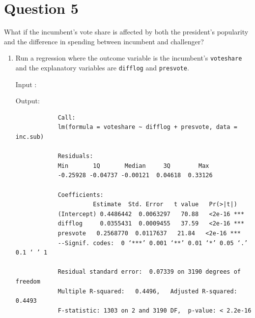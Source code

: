 \documentclass[12pt,letterpaper]{article}
\begin{document}
\section*{Question 5}
\noindent What if the incumbent's vote share is affected by both the president's popularity and the difference in spending between incumbent and challenger? 
	\begin{enumerate}
		\item Run a regression where the outcome variable is the incumbent's \texttt{voteshare} and the explanatory variables are \texttt{difflog} and \texttt{presvote}.	
		
		\noindent Input :
		  
		
		
		Output:
		\begin{verbatim}
			Call:
			lm(formula = voteshare ~ difflog + presvote, data = inc.sub)
			
			Residuals:    
			Min       1Q       Median     3Q        Max 
			-0.25928 -0.04737 -0.00121  0.04618  0.33126 
			
			Coefficients:            
			          Estimate  Std. Error   t value   Pr(>|t|)    
			(Intercept) 0.4486442  0.0063297   70.88   <2e-16 ***
			difflog     0.0355431  0.0009455   37.59   <2e-16 ***
			presvote   0.2568770  0.0117637   21.84   <2e-16 ***
			--Signif. codes:  0 ‘***’ 0.001 ‘**’ 0.01 ‘*’ 0.05 ‘.’ 0.1 ‘ ’ 1
			
			Residual standard error:  0.07339 on 3190 degrees of freedom
			Multiple R-squared:   0.4496,	Adjusted R-squared:      0.4493 
			F-statistic: 1303 on 2 and 3190 DF,  p-value: < 2.2e-16
			
		\end{verbatim}
		\normalsize
		

\end{enumerate}
\end{document}

